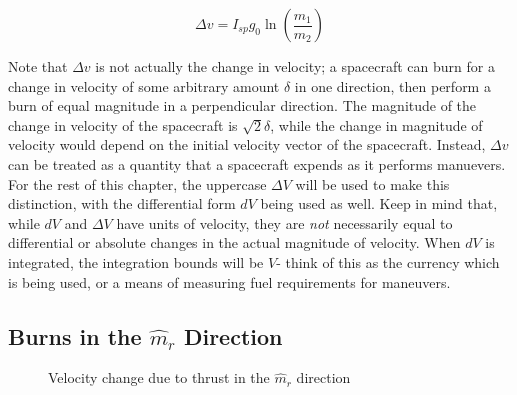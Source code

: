 \documentclass[../basicOrbitalDynamics.tex]{subfiles}
\begin{document}
\begin{equation}\label{Rocket Equation ISP}
    \Delta{}v=I_{sp}g_0\ln\left(\frac{m_1}{m_2}\right)
\end{equation}

Note that $\Delta v$ is not actually the change in velocity; a spacecraft can burn for a change in velocity of some arbitrary amount $\delta$ in one direction, then perform a burn of equal magnitude in a perpendicular direction. The magnitude of the change in velocity of the spacecraft is $\sqrt{2}\delta$, while the change in magnitude of velocity would depend on the initial velocity vector of the spacecraft. Instead, $\Delta v$ can be treated as a quantity that a spacecraft expends as it performs manuevers. For the rest of this chapter, the uppercase $\Delta V$ will be used to make this distinction, with the differential form $dV$ being used as well. Keep in mind that, while $dV$ and $\Delta V$ have units of velocity, they are \textit{not} necessarily equal to differential or absolute changes in the actual magnitude of velocity. When $dV$ is integrated, the integration bounds will be $V$- think of this as the currency which is being used, or a means of measuring fuel requirements for maneuvers.

\bigskip\bigskip
\subsection{Burns in the \texorpdfstring{$\hat{m}_r$}{Radial} Direction}\label{sec:Mr manuevers}

\begin{figure}[H]
    \centering
    \caption{Velocity change due to thrust in the $\hat{m}_r$ direction}\label{fig:dV Triangle Mr}
\end{figure}
\end{document}
